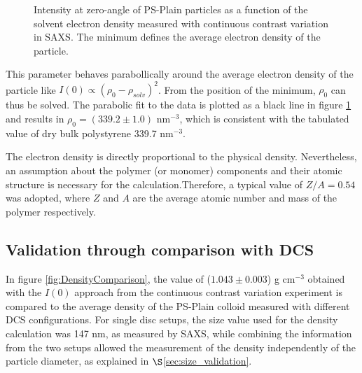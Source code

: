 \begin{figure}
	\begin{center}
		
	\end{center}
	\caption{Intensity at zero-angle of PS-Plain particles as a function of the solvent electron density measured with continuous contrast variation in SAXS. The minimum defines the average electron density of the particle.}
	\label{fig:PSPlainAverageDensity}
\end{figure}

This parameter behaves parabollically around the average electron density of the particle like $I(0)\propto \left( \rho_0 - \rho_{solv} \right)^2$\citep{avdeev_contrast_2007}. From the position of the minimum, $\rho_0$ can thus be solved. The parabolic fit to the data is plotted as a black line in figure \ref{fig:PSPlainAverageDensity} and results in $\rho_0=\left(339.2\pm1.0\right)$ nm$^{-3}$, which is consistent with the tabulated value of dry bulk polystyrene 339.7 nm$^{-3}$\citep{dingenouts_analysis_1999}.

The electron density is directly proportional to the physical density. Nevertheless, an assumption about the polymer (or monomer) components and their atomic structure is necessary for the calculation.Therefore, a typical value of $Z/A=0.54$ was adopted, where $Z$ and $A$ are the average atomic number and mass of the polymer respectively.

\subsection{Validation through comparison with DCS}

In figure \ref{fig:DensityComparison}, the value of ($1.043\pm0.003$) g cm$^{-3}$ obtained with the $I(0)$ approach from the continuous contrast variation experiment is compared to the average density of the PS-Plain colloid measured with different DCS configurations. For single disc setups, the size value used for the density calculation was 147 nm, as measured by SAXS, while combining the information from the two setups allowed the measurement of the density independently of the particle diameter, as explained in $\S$\ref{sec:size_validation}.

